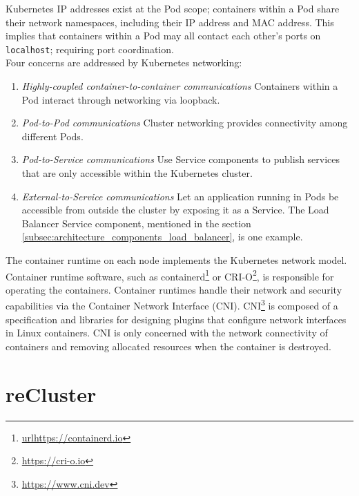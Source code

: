 Kubernetes IP addresses exist at the Pod scope; containers within a Pod share their
network namespaces, including their IP address and MAC address. This implies that
containers within a Pod may all contact each other's ports on \texttt{localhost};
requiring port coordination. \\ %
Four concerns are addressed by Kubernetes networking:
\begin{enumerate}
  \item \textit{Highly-coupled container-to-container communications}
    \newline
    Containers within a Pod interact through networking via loopback.

  \item \textit{Pod-to-Pod communications}
    \newline
    Cluster networking provides connectivity among different Pods.

  \item \textit{Pod-to-Service communications}
    \newline
    Use Service components to publish services that are only accessible within
    the Kubernetes cluster.

  \item \textit{External-to-Service communications}
    \newline
    Let an application running in Pods be accessible from outside the cluster by
    exposing it as a Service. The Load Balancer Service component, mentioned in
    the section \ref{subsec:architecture_components_load_balancer}, is one example.
\end{enumerate}
The container runtime on each node implements the Kubernetes network model. Container
runtime software, such as containerd\footnote{\url{urlhttps://containerd.io}} or
CRI-O\footnote{\url{https://cri-o.io}}, is responsible for operating the containers.
Container runtimes handle their network and security capabilities via the
Container Network Interface (CNI). CNI\footnote{\url{https://www.cni.dev}} is composed
of a specification and libraries for designing plugins that configure network interfaces
in Linux containers. CNI is only concerned with the network connectivity of
containers and removing allocated resources when the container is destroyed.

\section{reCluster}
\label{sec:architecture_recluster}

